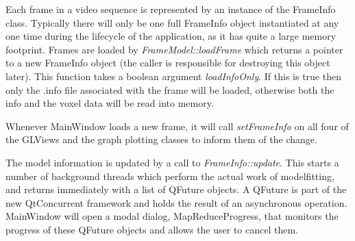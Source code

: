 Each frame in a video sequence is represented by an instance of the FrameInfo class.
Typically there will only be one full FrameInfo object instantiated at any one time during the lifecycle of the application, as it has quite a large memory footprint.
Frames are loaded by \emph{FrameModel::loadFrame} which returns a pointer to a new FrameInfo object (the caller is responsible for destroying this object later).
This function takes a boolean argument \emph{loadInfoOnly}.
If this is true then only the .info file associated with the frame will be loaded, otherwise both the info and the voxel data will be read into memory.

Whenever MainWindow loads a new frame, it will call \emph{setFrameInfo} on all four of the GLViews and the graph plotting classes to inform them of the change.

The model information is updated by a call to \emph{FrameInfo::update}.
This starts a number of background threads which perform the actual work of modelfitting, and returns immediately with a list of QFuture objects.
A QFuture is part of the new QtConcurrent framework and holds the result of an asynchronous operation.
MainWindow will open a modal dialog, MapReduceProgress, that monitors the progress of these QFuture objects and allows the user to cancel them.


